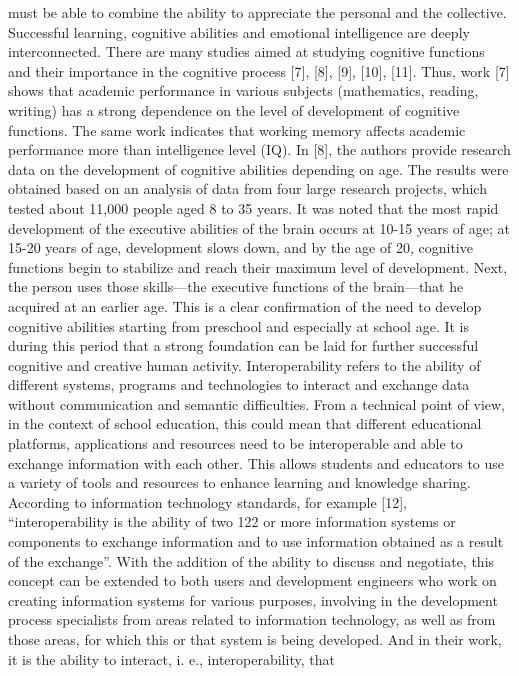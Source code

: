 \documentclass[twocolumn]{article}
\begin{document}
must be able to combine the ability to appreciate the
personal and the collective.
Successful learning, cognitive abilities and emotional
intelligence are deeply interconnected. There are many
studies aimed at studying cognitive functions and their
importance in the cognitive process [7], [8], [9], [10],
[11]. Thus, work [7] shows that academic performance
in various subjects (mathematics, reading, writing) has
a strong dependence on the level of development of
cognitive functions. The same work indicates that working memory affects academic performance more than
intelligence level (IQ).
In [8], the authors provide research data on the development of cognitive abilities depending on age. The
results were obtained based on an analysis of data from
four large research projects, which tested about 11,000
people aged 8 to 35 years. It was noted that the most rapid
development of the executive abilities of the brain occurs
at 10-15 years of age; at 15-20 years of age, development
slows down, and by the age of 20, cognitive functions
begin to stabilize and reach their maximum level of
development. Next, the person uses those skills—the
executive functions of the brain—that he acquired at an
earlier age. This is a clear confirmation of the need to
develop cognitive abilities starting from preschool and
especially at school age. It is during this period that
a strong foundation can be laid for further successful
cognitive and creative human activity.
Interoperability refers to the ability of different systems, programs and technologies to interact and exchange
data without communication and semantic difficulties.
From a technical point of view, in the context of school
education, this could mean that different educational
platforms, applications and resources need to be interoperable and able to exchange information with each other.
This allows students and educators to use a variety of
tools and resources to enhance learning and knowledge
sharing. According to information technology standards,
for example [12], “interoperability is the ability of two
122
or more information systems or components to exchange
information and to use information obtained as a result of
the exchange”. With the addition of the ability to discuss
and negotiate, this concept can be extended to both
users and development engineers who work on creating
information systems for various purposes, involving in
the development process specialists from areas related to
information technology, as well as from those areas, for
which this or that system is being developed. And in their
work, it is the ability to interact, i. e., interoperability, that
\end{document}
